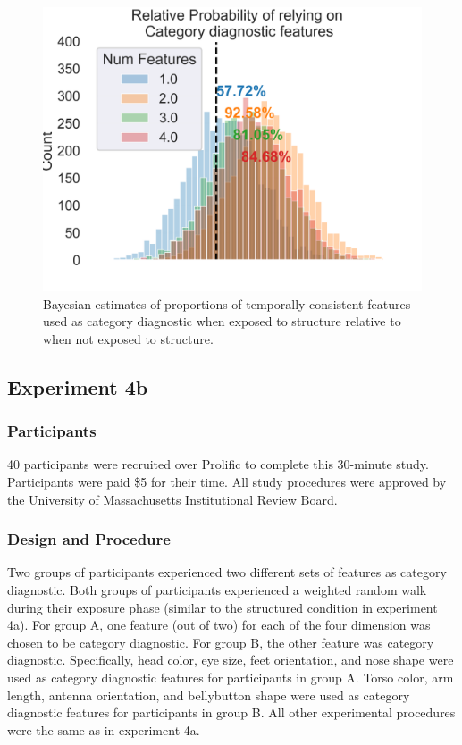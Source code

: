 \begin{figure}[h]
    \centering
    \label{fig:exp4a-bayesmodel-choice-accuracy}
    \caption{Bayesian estimates of proportions of temporally consistent features used as category diagnostic when exposed to structure relative to when not exposed to structure.}
    \includegraphics[width = \textwidth]{chapter_notebooks/chapter_4/figures/exp4_bayesmodel_res.png}
\end{figure}

\subsection{Experiment 4b}

\subsubsection*{Participants}
40 participants were recruited over Prolific to complete this 30-minute study. Participants were paid \$5 for their time. All study procedures were approved by the University of Massachusetts Institutional Review Board. 

\subsubsection*{Design and Procedure}
Two groups of participants experienced two different sets of features as category diagnostic. Both groups of participants experienced a weighted random walk during their exposure phase (similar to the structured condition in experiment 4a). For group A, one feature (out of two) for each of the four dimension was chosen to be category diagnostic. For group B, the other feature was category diagnostic. Specifically, head color, eye size, feet orientation, and nose shape were used as category diagnostic features for participants in group A. Torso color, arm length, antenna orientation, and bellybutton shape were used as category diagnostic features for participants in group B. All other experimental procedures were the same as in experiment 4a. 

